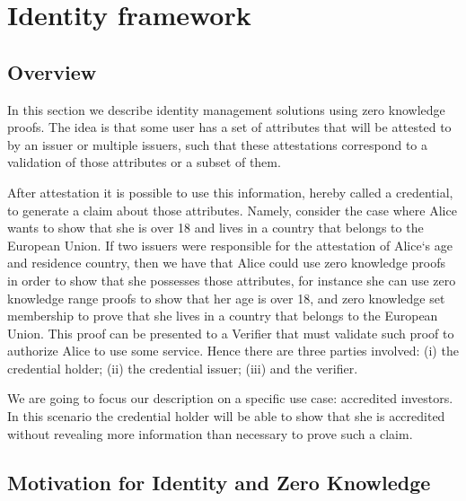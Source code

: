 

\section{Identity framework}
\label{apps:id-framework}



\subsection{Overview}


In this section we describe identity management solutions using zero knowledge proofs. The idea is that some user has a set of attributes that will be attested to by an issuer or multiple issuers, such that these attestations correspond to a validation of those attributes or a subset of them. 


After attestation it is possible to use this information, hereby called a credential, to generate a claim about those attributes. Namely, consider the case where Alice wants to show that she is over 18 and lives in a country that belongs to the European Union. If two issuers were responsible for the attestation of Alice`s age and residence country, then we have that Alice could use zero knowledge proofs in order to show that she possesses those attributes, for instance she can use zero knowledge range proofs to show that her age is over 18, and zero knowledge set membership to prove that she lives in a country that belongs to the European Union. This proof can be presented to a Verifier that must validate such proof to authorize Alice to use some service. Hence there are three parties involved: (i) the credential holder; (ii) the credential issuer; (iii) and the verifier.  


We are going to focus our description on a specific use case: accredited investors. In this scenario the credential holder will be able to show that she is accredited without revealing more information than necessary to prove such a claim.   


\subsection{Motivation for Identity and Zero Knowledge}

